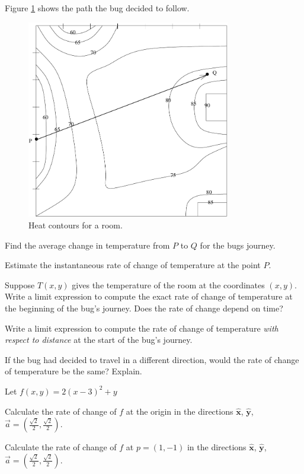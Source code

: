 \documentclass{problemset}
\newcommand{\xh}{{\hat {\mathbf x}}}
\newcommand{\yh}{{\hat {\mathbf y}}}
\begin{document}
	\question Figure \ref{heatcontour2} shows the path the bug decided to follow.
	\begin{figure}[h!]
		\begin{center}
			\includegraphics[width=3.5in]{heat_contour2.pdf}
		\end{center}
		\vspace{-.5cm}
		\caption{Heat contours for a room.}
		\label{heatcontour2}
	\end{figure}
	\begin{parts}
		\item Find the average change in temperature from $P$ to $Q$ for the bugs journey.
		\item Estimate the instantaneous rate of change of temperature at the point $P$.
		\item Suppose $T(x,y)$ gives the temperature of the room at the coordinates $(x,y)$.
			Write a limit expression to compute the exact rate of change of temperature
			at the beginning of the bug's journey. Does the rate of change depend on time?
		\item Write a limit expression to compute the rate of change of temperature
			\emph{with respect to distance} at the start of the bug's journey.
		\item If the bug had decided to travel in a different direction, would the rate of change
			of temperature be the same?  Explain.
	\end{parts}
	
	\newpage
	\question
	Let $f(x,y) = 2(x-3)^2+y$
	\begin{parts}
		\item Calculate the rate of change of $f$ at the origin 
			in the directions $\xh$, $\yh$, $\vec a=(\tfrac{\sqrt{2}}{2},\tfrac{\sqrt{2}}{2})$.
		\item Calculate the rate of change of $f$ at $p=(1,-1)$
			in the directions $\xh$, $\yh$, $\vec a=(\tfrac{\sqrt{2}}{2},\tfrac{\sqrt{2}}{2})$.
	\end{parts}
\end{document}
